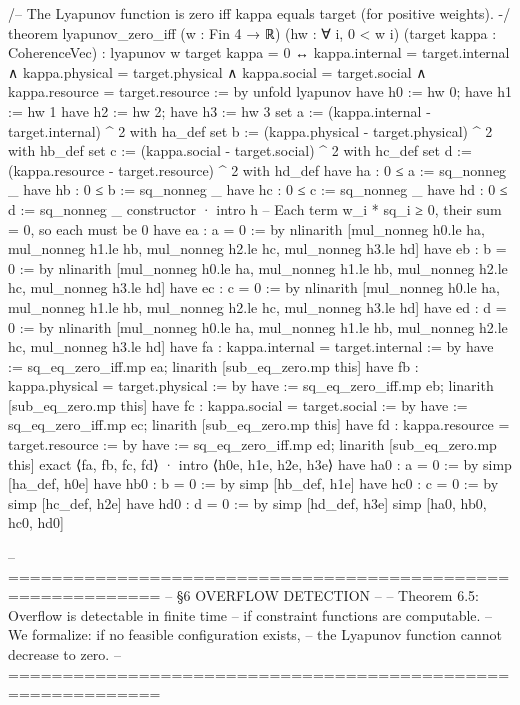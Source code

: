 /-- The Lyapunov function is zero iff kappa equals target
    (for positive weights). -/
theorem lyapunov_zero_iff (w : Fin 4 → ℝ) (hw : ∀ i, 0 < w i)
    (target kappa : CoherenceVec) :
    lyapunov w target kappa = 0 ↔
    kappa.internal = target.internal ∧
    kappa.physical = target.physical ∧
    kappa.social   = target.social   ∧
    kappa.resource = target.resource := by
  unfold lyapunov
  have h0 := hw 0; have h1 := hw 1
  have h2 := hw 2; have h3 := hw 3
  set a := (kappa.internal - target.internal) ^ 2 with ha_def
  set b := (kappa.physical - target.physical) ^ 2 with hb_def
  set c := (kappa.social   - target.social)   ^ 2 with hc_def
  set d := (kappa.resource - target.resource) ^ 2 with hd_def
  have ha : 0 ≤ a := sq_nonneg _
  have hb : 0 ≤ b := sq_nonneg _
  have hc : 0 ≤ c := sq_nonneg _
  have hd : 0 ≤ d := sq_nonneg _
  constructor
  · intro h
    -- Each term w_i * sq_i ≥ 0, their sum = 0, so each must be 0
    have ea : a = 0 := by
      nlinarith [mul_nonneg h0.le ha, mul_nonneg h1.le hb,
                 mul_nonneg h2.le hc, mul_nonneg h3.le hd]
    have eb : b = 0 := by
      nlinarith [mul_nonneg h0.le ha, mul_nonneg h1.le hb,
                 mul_nonneg h2.le hc, mul_nonneg h3.le hd]
    have ec : c = 0 := by
      nlinarith [mul_nonneg h0.le ha, mul_nonneg h1.le hb,
                 mul_nonneg h2.le hc, mul_nonneg h3.le hd]
    have ed : d = 0 := by
      nlinarith [mul_nonneg h0.le ha, mul_nonneg h1.le hb,
                 mul_nonneg h2.le hc, mul_nonneg h3.le hd]
    have fa : kappa.internal = target.internal := by
      have := sq_eq_zero_iff.mp ea; linarith [sub_eq_zero.mp this]
    have fb : kappa.physical = target.physical := by
      have := sq_eq_zero_iff.mp eb; linarith [sub_eq_zero.mp this]
    have fc : kappa.social = target.social := by
      have := sq_eq_zero_iff.mp ec; linarith [sub_eq_zero.mp this]
    have fd : kappa.resource = target.resource := by
      have := sq_eq_zero_iff.mp ed; linarith [sub_eq_zero.mp this]
    exact ⟨fa, fb, fc, fd⟩
  · intro ⟨h0e, h1e, h2e, h3e⟩
    have ha0 : a = 0 := by simp [ha_def, h0e]
    have hb0 : b = 0 := by simp [hb_def, h1e]
    have hc0 : c = 0 := by simp [hc_def, h2e]
    have hd0 : d = 0 := by simp [hd_def, h3e]
    simp [ha0, hb0, hc0, hd0]

-- ============================================================
-- §6  OVERFLOW DETECTION
--
-- Theorem 6.5: Overflow is detectable in finite time
-- if constraint functions are computable.
-- We formalize: if no feasible configuration exists,
-- the Lyapunov function cannot decrease to zero.
-- ============================================================

